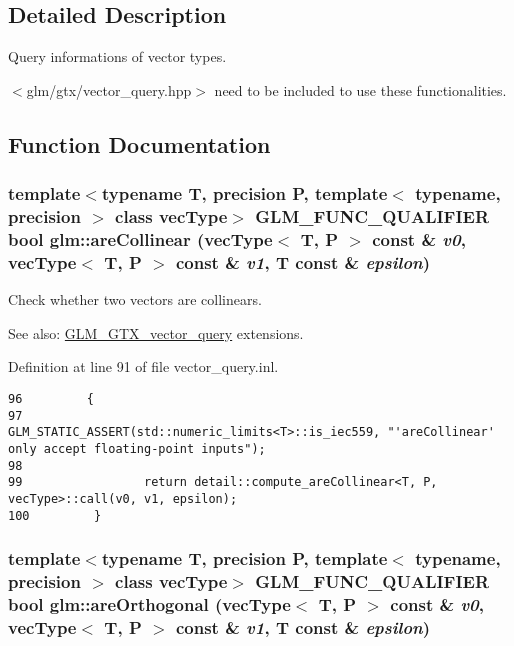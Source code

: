 \subsection{Detailed Description}
Query informations of vector types. 

$<$glm/gtx/vector\_\-query.hpp$>$ need to be included to use these functionalities. 

\subsection{Function Documentation}
\hypertarget{group__gtx__vector__query_gbfc6fa0b52f1ad33ffe31d41535f7069}{
\subsubsection[areCollinear]{\setlength{\rightskip}{0pt plus 5cm}template$<$typename T, precision P, template$<$ typename, precision $>$ class vecType$>$ GLM\_\-FUNC\_\-QUALIFIER bool glm::areCollinear (vecType$<$ T, P $>$ const \& {\em v0}, \/  vecType$<$ T, P $>$ const \& {\em v1}, \/  T const \& {\em epsilon})}}
\label{group__gtx__vector__query_gbfc6fa0b52f1ad33ffe31d41535f7069}


Check whether two vectors are collinears. \begin{Desc}
\item[See also:]\hyperlink{group__gtx__vector__query}{GLM\_\-GTX\_\-vector\_\-query} extensions. \end{Desc}


Definition at line 91 of file vector\_\-query.inl.

\begin{Code}\begin{verbatim}96         {
97                 GLM_STATIC_ASSERT(std::numeric_limits<T>::is_iec559, "'areCollinear' only accept floating-point inputs");
98 
99                 return detail::compute_areCollinear<T, P, vecType>::call(v0, v1, epsilon);
100         }
\end{verbatim}
\end{Code}


\hypertarget{group__gtx__vector__query_g9af1cd34fdb7c3cdeb11c0235fe7c468}{
\subsubsection[areOrthogonal]{\setlength{\rightskip}{0pt plus 5cm}template$<$typename T, precision P, template$<$ typename, precision $>$ class vecType$>$ GLM\_\-FUNC\_\-QUALIFIER bool glm::areOrthogonal (vecType$<$ T, P $>$ const \& {\em v0}, \/  vecType$<$ T, P $>$ const \& {\em v1}, \/  T const \& {\em epsilon})}}
\label{group__gtx__vector__query_g9af1cd34fdb7c3cdeb11c0235fe7c468}


